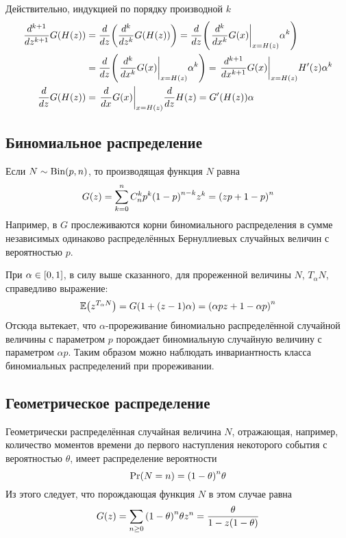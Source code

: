 \documentclass[a4paper]{article}
\let\originalleft\left
\let\originalright\right
\renewcommand{\left}{\mathopen{}\mathclose\bgroup\originalleft}
\renewcommand{\right}{\aftergroup\egroup\originalright}
\newcommand{\clo}[1]{{\left [ #1 \right ]}}
\newcommand{\brac}[1]{{\left ( #1 \right )}}
\newcommand{\induc}[1]{{\left . #1 \right \vert}}
\newcommand{\Ex}[0]{{\mathbb{E}}}
\begin{document}
Действительно, индукцией по порядку производной $k$ \begin{align*}
	\frac{d^{k+1}}{dz^{k+1}} G\brac{H(z)}
		& = \frac{d}{dz}\brac{ \frac{d^k}{dz^k} G\brac{H(z)} }
		= \frac{d}{dz}\brac{ \induc{\frac{d^k}{dx^k} G(x) }_{x=H(z)} \alpha^k } \\
		& = \frac{d}{dz}\brac{ \induc{\frac{d^k}{dx^k} G(x) }_{x=H(z)} \alpha^k }
		= \induc{\frac{d^{k+1}}{dx^{k+1}} G(x) }_{x=H(z)} H'(z) \alpha^k \\
	\frac{d}{dz} G\brac{H(z)}
		& = \induc{\frac{d}{dx} G(x) }_{x=H(z)} \frac{d}{dz} H(z)
		= G'\brac{H(z)} \alpha
\end{align*}


\subsection{Биномиальное распределение} %
\label{sub:binomial}

Если $N\sim\text{Bin}\brac{p,n}$, то производящая функция $N$ равна
\[G(z) = \sum_{k=0}^n C_n^k p^k \brac{1-p}^{n-k} z^k
	= \brac{ zp + 1-p }^n\]
Например, в $G$ прослеживаются корни биномиального распределения в сумме
независимых одинаково распределённых Бернуллиевых случайных величин с
вероятностью $p$.

При $\alpha\in \clo{0,1}$, в силу выше сказанного, для прореженной величины
$N$, $T_\alpha N$, справедливо выражение:
\[\Ex\brac{z^{T_\alpha N}} = G\brac{1 + (z-1) \alpha}
	= \brac{ \alpha p z + 1 - \alpha p }^n\]
Отсюда вытекает, что $\alpha$-прореживание биномиально распределённой
случайной величины с параметром $p$ порождает биномиальную случайную величину
с параметром $\alpha p$.
Таким образом можно наблюдать инвариантность класса биномиальных распределений
при прореживании.


\subsection{Геометрическое распределение} %
\label{sub:geometric}

Геометрически распределённая случайная величина $N$, отражающая, например,
количество моментов времени до первого наступления некоторого события с
вероятностью $\theta$, имеет распределение вероятности
\[\Pr(N=n) = \brac{1-\theta}^n \theta \]
Из этого следует, что порождающая функция $N$ в этом случае равна
\[G(z) = \sum_{n\geq 0} \brac{1-\theta}^n \theta z^n = \frac{\theta}{1 - z (1-\theta)}\]
\end{document}
